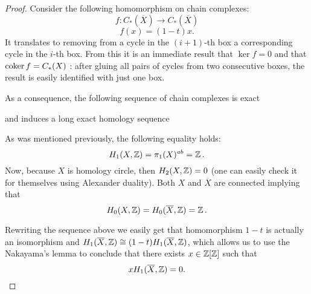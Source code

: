 \begin{proof}
  Consider the following homomorphism on chain complexes:
  $$f:C_*(\overline{X})\to C_*(\overline{X})$$
  $$f(x)=(1-t)x.$$
  It translates to removing from a cycle in the $(i+1)$-th box a corresponding cycle in the $i$-th box. From this it is an immediate result that $\ker f=0$ and that $\operatorname{coker} f=C_*(X)$ : after gluing all pairs of cycles from two consecutive boxes, the result is easily identified with just one box.

  As a consequence, the following sequence of chain complexes is exact
  \begin{center}
  \end{center}
  and induces a long exact homology sequence
  \begin{center}
  \end{center}
  As was mentioned previously, the following equality holds:
  $$H_1(X, \operatorname{\mathbb{Z}})=\pi_1(X)^{ab}=\operatorname{\mathbb{Z}}.$$
  Now, because $X$ is homology circle, then $H_2(X, \operatorname{\mathbb{Z}})=0$ (one can easily check it for themselves using Alexander duality). Both $X$ and $\overline{X}$ are connected implying that 
  $$H_0(X, \operatorname{\mathbb{Z}})=H_0(\overline{X}, \operatorname{\mathbb{Z}})=\operatorname{\mathbb{Z}}.$$
  \begin{center}
  \end{center}
  Rewriting the sequence above we easily get that homomorphism $1-t$ is actually an isomorphism and $H_1(\overline{X}, \operatorname{\mathbb{Z}})\cong (1-t) H_1(\overline{X}, \operatorname{\mathbb{Z}})$, which allows us to use the Nakayama's lemma \cite[Proposition~2.6]{atiyah} to conclude that there exists $x\in\operatorname{\mathbb{Z}}[\operatorname{\mathbb{Z}}]$ such that
  $$xH_1(\overline{X}, \operatorname{\mathbb{Z}})=0.$$
\end{proof}

